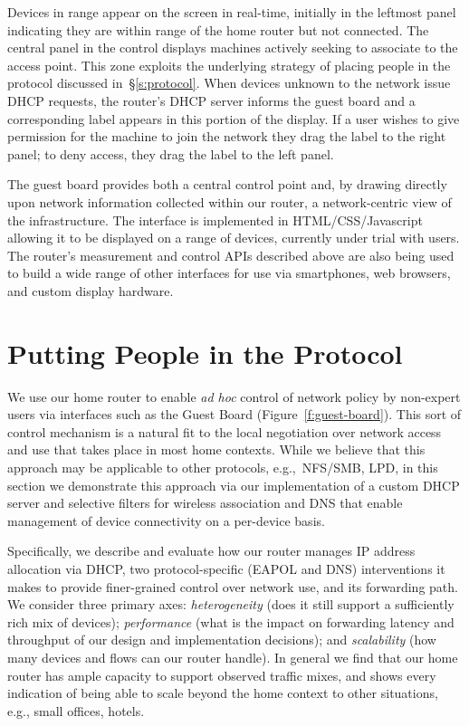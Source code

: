 Devices in range appear on the screen in real-time, initially in the leftmost
panel indicating they are within range of the home router but not connected.
The central panel in the control displays machines actively seeking to associate
to the access point. This zone exploits the underlying
strategy of placing people in the protocol discussed in~\S\ref{s:protocol}.  
When devices unknown to the network issue DHCP requests, the router's DHCP
server informs the guest board and a corresponding label appears in this portion
of the display.  If a user wishes to give permission for the machine to join the
network they drag the label to the right panel; to deny access, they drag the
label to the left panel.

The guest board provides both a central control point and, by drawing directly
upon network information collected within our router, a network-centric view of
the infrastructure.  The interface is implemented in HTML/CSS/Javascript
allowing it to be displayed on a range of devices, currently under trial with
users.  The router's measurement and control APIs described above are also being
used to build a wide range of other interfaces for use via smartphones, web
browsers, and custom display hardware.

\section{Putting People in the Protocol} \label{s:protocols}

We use our home router to enable \emph{ad hoc} control of network policy by
non-expert users via interfaces such as the Guest Board
(Figure~\ref{f:guest-board}).  This sort of control mechanism is a natural fit
to the local negotiation over network access and use that takes place in most
home contexts.  While we believe that this approach may be applicable to other
protocols, e.g.,~NFS/SMB, LPD, in this section we demonstrate this approach via
our implementation of a custom DHCP server and selective filters for wireless
association and DNS that enable management of device connectivity on a
per-device basis. 

Specifically, we describe and evaluate how our router manages IP address
allocation via DHCP, two protocol-specific (EAPOL and DNS) interventions it
makes to provide finer-grained control over network use, and its forwarding
path.  We consider three primary axes: \emph{heterogeneity} (does it still
support a sufficiently rich mix of devices); \emph{performance} (what is the
impact on forwarding latency and throughput of our design and implementation
decisions); and \emph{scalability} (how many devices and flows can our router
handle).  In general we find that our home router has ample capacity to support
observed traffic mixes, and shows every indication of being able to scale beyond
the home context to other situations, e.g., small offices, hotels. 


